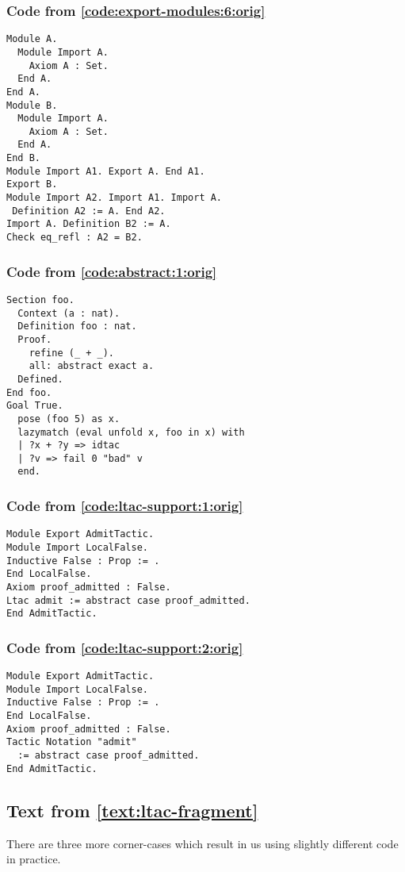 \documentclass[a4paper,USenglish,cleveref,autoref,thm-restate]{lipics-v2021}
\begin{document}
\subsubsection{Code from \autoref{code:export-modules:6:orig}}\label{code:export-modules:6}
\begin{verbatim}
Module A.
  Module Import A.
    Axiom A : Set.
  End A.
End A.
Module B.
  Module Import A.
    Axiom A : Set.
  End A.
End B.
Module Import A1. Export A. End A1.
Export B.
Module Import A2. Import A1. Import A.
 Definition A2 := A. End A2.
Import A. Definition B2 := A.
Check eq_refl : A2 = B2.
\end{verbatim}

\subsubsection{Code from \autoref{code:abstract:1:orig}}\label{code:abstract:1}
\begin{verbatim}
Section foo.
  Context (a : nat).
  Definition foo : nat.
  Proof.
    refine (_ + _).
    all: abstract exact a.
  Defined.
End foo.
Goal True.
  pose (foo 5) as x.
  lazymatch (eval unfold x, foo in x) with
  | ?x + ?y => idtac
  | ?v => fail 0 "bad" v
  end.
\end{verbatim}

\subsubsection{Code from \autoref{code:ltac-support:1:orig}}\label{code:ltac-support:1}
\begin{verbatim}
Module Export AdmitTactic.
Module Import LocalFalse.
Inductive False : Prop := .
End LocalFalse.
Axiom proof_admitted : False.
Ltac admit := abstract case proof_admitted.
End AdmitTactic.
\end{verbatim}
\subsubsection{Code from \autoref{code:ltac-support:2:orig}}\label{code:ltac-support:2}
\begin{verbatim}
Module Export AdmitTactic.
Module Import LocalFalse.
Inductive False : Prop := .
End LocalFalse.
Axiom proof_admitted : False.
Tactic Notation "admit"
  := abstract case proof_admitted.
End AdmitTactic.
\end{verbatim}


\subsection{Text from \autoref{text:ltac-fragment}}\label{text:ltac-fragment}
There are three more corner-cases which result in us using slightly different code in practice.
\end{document}

